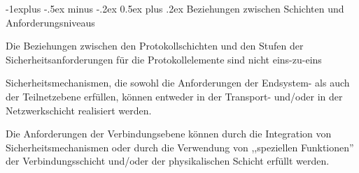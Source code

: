 \documentclass[a4paper]{article}
\makeatletter
\renewcommand{\subsection}{\@startsection{subsection}{2}{0mm}%
 {-1explus -.5ex minus -.2ex}%
 {0.5ex plus .2ex}%
 {\normalfont\normalsize\bfseries}}
\makeatother
\begin{document}
\begin{multicols}{3}
      \subsection{Beziehungen zwischen Schichten und Anforderungsniveaus}
      \begin{itemize*}
            \item Die Beziehungen zwischen den Protokollschichten und den Stufen der Sicherheitsanforderungen für die Protokollelemente sind nicht eins-zu-eins
            \item Sicherheitsmechanismen, die sowohl die Anforderungen der Endsystem- als auch der Teilnetzebene erfüllen, können entweder in der Transport- und/oder in der Netzwerkschicht realisiert werden.
            \item Die Anforderungen der Verbindungsebene können durch die Integration von Sicherheitsmechanismen oder durch die Verwendung von ,,speziellen Funktionen'' der Verbindungsschicht und/oder der physikalischen Schicht erfüllt werden.
      \end{itemize*}


\end{multicols}
\end{document}
